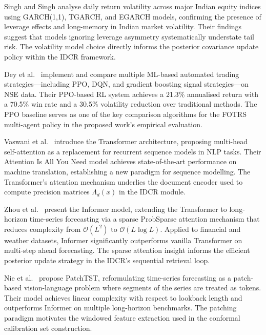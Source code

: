 \documentclass[12pt,a4paper,oneside]{report}
\theoremstyle{definition}
\theoremstyle{remark}
\begin{document}
\medskip

\noindent Singh and Singh \cite{Singh2025IndianVolatility} analyse daily return volatility across major Indian equity indices using GARCH(1,1), TGARCH, and EGARCH models, confirming the presence of leverage effects and long-memory in Indian market volatility. Their findings suggest that models ignoring leverage asymmetry systematically understate tail risk. The volatility model choice directly informs the posterior covariance update policy within the IDCR framework.

\medskip

\noindent Dey et al.\ \cite{Dey2025MLTrading} implement and compare multiple ML-based automated trading strategies---including PPO, DQN, and gradient boosting signal strategies---on NSE data. Their PPO-based RL system achieves a 21.3\% annualised return with a 70.5\% win rate and a 30.5\% volatility reduction over traditional methods. The PPO baseline serves as one of the key comparison algorithms for the FOTRS multi-agent policy in the proposed work's empirical evaluation.

\medskip

\noindent Vaswani et al.\ \cite{Vaswani2017Attention} introduce the Transformer architecture, proposing multi-head self-attention as a replacement for recurrent sequence models in NLP tasks. Their Attention Is All You Need model achieves state-of-the-art performance on machine translation, establishing a new paradigm for sequence modelling. The Transformer's attention mechanism underlies the document encoder used to compute precision matrices $\Lambda_d(x)$ in the IDCR module.

\medskip

\noindent Zhou et al.\ \cite{Zhou2021Informer} present the Informer model, extending the Transformer to long-horizon time-series forecasting via a sparse ProbSparse attention mechanism that reduces complexity from $\mathcal{O}(L^2)$ to $\mathcal{O}(L \log L)$. Applied to financial and weather datasets, Informer significantly outperforms vanilla Transformer on multi-step ahead forecasting. The sparse attention insight informs the efficient posterior update strategy in the IDCR's sequential retrieval loop.

\medskip

\noindent Nie et al.\ \cite{Nie2023PatchTST} propose PatchTST, reformulating time-series forecasting as a patch-based vision-language problem where segments of the series are treated as tokens. Their model achieves linear complexity with respect to lookback length and outperforms Informer on multiple long-horizon benchmarks. The patching paradigm motivates the windowed feature extraction used in the conformal calibration set construction.
\end{document}
